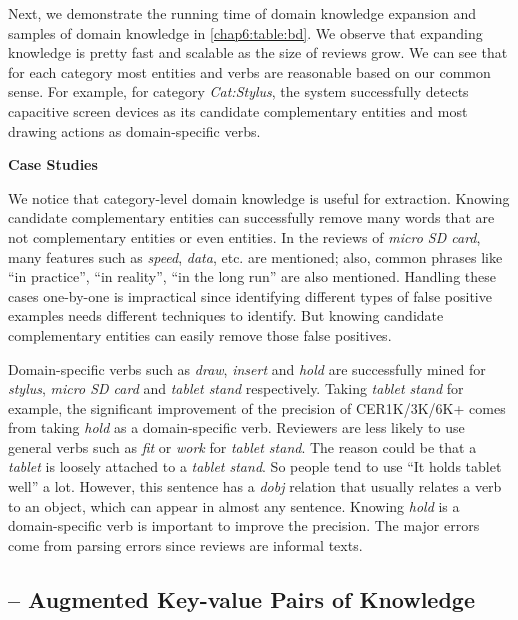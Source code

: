 Next, we demonstrate the running time of domain knowledge expansion and samples of domain knowledge in \ref{chap6:table:bd}. We observe that expanding knowledge is pretty fast and scalable as the size of reviews grow. We can see that for each category most entities and verbs are reasonable based on our common sense. For example, for category \textit{Cat:Stylus}, the system successfully detects capacitive screen devices as its candidate complementary entities and most drawing actions as domain-specific verbs.

\textbf{Case Studies}

We notice that category-level domain knowledge is useful for extraction. Knowing candidate complementary entities can successfully remove many words that are not complementary entities or even entities. In the reviews of \textit{micro SD card}, many features such as \textit{speed}, \textit{data}, etc. are mentioned; also, common phrases like ``in practice'', ``in reality'', ``in the long run'' are also mentioned. Handling these cases one-by-one is impractical since identifying different types of false positive examples needs different techniques to identify. But knowing candidate complementary entities can easily remove those false positives. 

Domain-specific verbs such as \textit{draw}, \textit{insert} and \textit{hold} are successfully mined for \textit{stylus}, \textit{micro SD card} and \textit{tablet stand} respectively. Taking \textit{tablet stand} for example, the significant improvement of the precision of CER1K/3K/6K+ comes from taking \textit{hold} as a domain-specific verb. Reviewers are less likely to use general verbs such as \textit{fit} or \textit{work} for \textit{tablet stand}. The reason could be that a \textit{tablet} is loosely attached to a \textit{tablet stand}. So people tend to use ``It holds tablet well'' a lot. However, this sentence has a \textit{dobj} relation that usually relates a verb to an object, which can appear in almost any sentence. Knowing \textit{hold} is a domain-specific verb is important to improve the precision. The major errors come from parsing errors since reviews are informal texts.


\subsection{-- Augmented Key-value Pairs of Knowledge}

